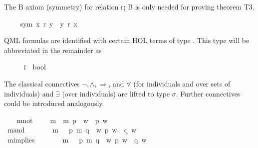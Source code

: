 \begin{isabellebody}
\begin{isamarkuptext}
The B axiom (symmetry) for relation r; B is only needed for proving theorem T3.%
\end{isamarkuptext}%
\isamarkuptrue%
\ \ \isamarkupfalse%
\ \ sym{\isacharcolon}\ {\isachardoublequoteopen}x\ r\ y\ {\isasymlongrightarrow}\ y\ r\ x{\isachardoublequoteclose}%
\begin{isamarkuptext}%
QML formulas are identified with certain HOL terms of type . 
 This type will be abbreviated in the remainder as \isa{{\isasymsigma}}%
\end{isamarkuptext}%
\isamarkuptrue%
\ \ \isamarkupfalse%
\ {\isasymsigma}\ {\isacharequal}\ {\isachardoublequoteopen}{\isacharparenleft}i\ {\isasymRightarrow}\ bool{\isacharparenright}{\isachardoublequoteclose}%
\begin{isamarkuptext}%
The classical connectives $\neg, \wedge, \Rightarrow$, and $\forall$
 (for individuals and over sets of individuals) and $\exists$ (over individuals) are
 lifted to type $\sigma$. Further connectives could be introduced analogously.%
\end{isamarkuptext}%
\isamarkuptrue%
\ \ \isamarkupfalse%
\ mnot\ {\isacharcolon}{\isacharcolon}\ {\isachardoublequoteopen}{\isasymsigma}\ {\isasymRightarrow}\ {\isasymsigma}{\isachardoublequoteclose}\ {\isacharparenleft}{\isachardoublequoteopen}m{\isasymnot}{\isachardoublequoteclose}{\isacharparenright}\ \ {\isachardoublequoteopen}m{\isasymnot}\ p\ {\isacharequal}\ {\isacharparenleft}{\isasymlambda}w{\isachardot}\ {\isasymnot}\ p\ w{\isacharparenright}{\isachardoublequoteclose}\ \ \ \ \isanewline
\ \ \isamarkupfalse%
\ mand\ {\isacharcolon}{\isacharcolon}\ {\isachardoublequoteopen}{\isasymsigma}\ {\isasymRightarrow}\ {\isasymsigma}\ {\isasymRightarrow}\ {\isasymsigma}{\isachardoublequoteclose}\ {\isacharparenleft}\ {\isachardoublequoteopen}m{\isasymand}{\isachardoublequoteclose}\ {}{}{\isacharparenright}\ \ {\isachardoublequoteopen}p\ m{\isasymand}\ q\ {\isacharequal}\ {\isacharparenleft}{\isasymlambda}w{\isachardot}\ p\ w\ {\isasymand}\ q\ w{\isacharparenright}{\isachardoublequoteclose}\ \ \ \isanewline
\ \ \isamarkupfalse%
\ mimplies\ {\isacharcolon}{\isacharcolon}\ {\isachardoublequoteopen}{\isasymsigma}\ {\isasymRightarrow}\ {\isasymsigma}\ {\isasymRightarrow}\ {\isasymsigma}{\isachardoublequoteclose}\ {\isacharparenleft}\ {\isachardoublequoteopen}m{\isasymRightarrow}{\isachardoublequoteclose}\ {}{}{\isacharparenright}\ \ {\isachardoublequoteopen}p\ m{\isasymRightarrow}\ q\ {\isacharequal}\ {\isacharparenleft}{\isasymlambda}w{\isachardot}\ p\ w\ {\isasymlongrightarrow}\ q\ w{\isacharparenright}{\isachardoublequoteclose}\ \ \isanewline

\end{isabellebody}
